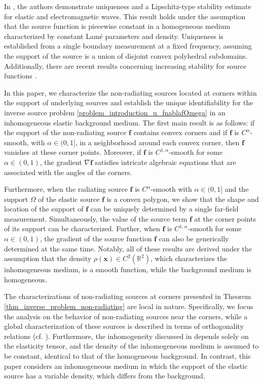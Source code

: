 \documentclass[11pt,reqno,oneside]{amsart}
\theoremstyle{definition}
\theoremstyle{remark}
\numberwithin{equation}{section}
\numberwithin{equation}{section}
\theoremstyle{remark}
\begin{document}
In \cite{zhai2023determination}, the authors demonstrate uniqueness and a Lipschitz-type stability estimate for elastic and electromagnetic waves. This result holds under the assumption that the source function is piecewise constant in a homogeneous medium characterized by constant Lam\'e parameters and density. Uniqueness is established from a single boundary measurement at a fixed frequency, assuming the support of the source is a union of disjoint convex polyhedral subdomains. Additionally, there are recent results concerning increasing stability for source functions \cite{bao2020stability, yuan2023increasing}.

In this paper, we characterize the non-radiating sources located at corners within the support of underlying sources and establish the unique identifiability for the inverse source problem \eqref{problem_introduction_u_fnablafOmega} in an inhomogeneous elastic background medium. The first main result is as follows: if the support of the non-radiating source $\mathbf{f}$ contains convex corners and if $\mathbf{f}$ is $C^{\alpha}$-smooth, with $\alpha \in (0,1]$, in a neighborhood around each convex corner, then $\mathbf{f}$ vanishes at these corner points. Moreover, if $\mathbf{f}$ is $C^{1,\alpha}$-smooth for some $\alpha \in (0,1)$, the gradient $\nabla \mathbf{f}$ satisfies intricate algebraic equations that are associated with the angles of the corners.

Furthermore, when the radiating source $\mathbf{f}$ is $C^{\alpha}$-smooth with $\alpha \in (0,1]$ and the support $\Omega$ of the elastic source $\mathbf{f}$ is a convex polygon, we show that the shape and location of the support of $\mathbf{f}$ can be uniquely determined by a single far-field measurement. Simultaneously, the value of the source term $\mathbf{f}$ at the corner points of its support can be characterized. Further, when $\mathbf{f}$ is $C^{1,\alpha}$-smooth for some $\alpha \in (0,1)$, the gradient of the source function $\mathbf{f}$ can also be generically determined at the same time. Notably, all of these results are derived under the assumption that the density $\rho(\mathbf{x}) \in C^2(\mathbb{R}^2)$, which characterizes the inhomogeneous medium, is a smooth function, while the background medium is homogeneous.

The characterizations of non-radiating sources at corners presented in Theorem \ref{thm_inverse_problem_non-radiating} are local in nature. Specifically, we focus the analysis on the behavior of non-radiating sources near the corners, while a global characterization of these sources is described in terms of orthogonality relations (cf. \cite{kow2021characterization}). Furthermore, the inhomogeneity discussed in \cite{kow2021characterization} depends solely on the elasticity tensor, and the density of the inhomogeneous medium is assumed to be constant, identical to that of the homogeneous background. In contrast, this paper considers an inhomogeneous medium in which the support of the elastic source has a variable density, which differs from the background.
\end{document}
